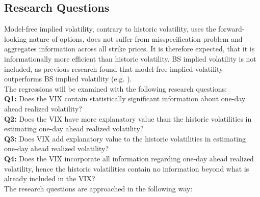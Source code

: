 \subsection{Research Questions}\label{sec:41aHypothesis}
Model-free implied volatility, contrary to historic volatility, uses the forward-looking nature of options, does not suffer from misspecification problem and aggregates information across all strike prices. It is therefore expected, that it is informationally more efficient than historic volatility. \ac{BS} implied volatility is not included, as previous research found that model-free implied volatility outperforms \ac{BS} implied volatility (e.g. \textcite{jiang2003, bakanova2010}).\\
The regressions will be examined with the following research questions:\\
\textbf{Q1:} Does the \ac{VIX} contain statistically significant information about one-day ahead realized volatility?\\
\textbf{Q2:} Does the \ac{VIX} have more explanatory value than the historic volatilities in estimating one-day ahead realized volatility?\\
\textbf{Q3:} Does \ac{VIX} add explanatory value to the historic volatilities in estimating one-day ahead realized volatility?\\
\textbf{Q4:} Does the \ac{VIX} incorporate all information regarding one-day ahead realized volatility, hence the historic volatilities contain no information beyond what is already included in the \ac{VIX}?\\
The research questions are approached in the following way:\\
